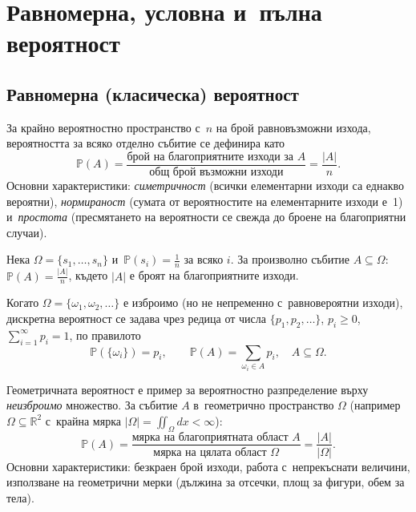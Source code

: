 \chapter{Равномерна, условна и~пълна вероятност}

\section{Равномерна (класическа) вероятност}

\begin{defbox}
За крайно вероятностно пространство с~$n$ на брой равновъзможни
изхода, вероятността за всяко отделно събитие се дефинира като
\[
  \mathbb{P}(A) = \frac{\text{брой на благоприятните изходи за } A}{\text{общ брой възможни изходи}} = \frac{|A|}{n}.
\]
Основни характеристики: \emph{симетричност} (всички елементарни
изходи са еднакво вероятни), \emph{нормираност} (сумата от
вероятностите на елементарните изходи е~1) и~\emph{простота}
(пресмятането на вероятности се свежда до броене на благоприятни
случаи).
\end{defbox}

\begin{rembox}
Нека $\Omega=\{s_1,\dots,s_n\}$ и~$\mathbb{P}(s_i)=\tfrac1n$ за всяко
$i$. За произволно събитие $A\subseteq\Omega$: $\mathbb{P}(A)=
\tfrac{|A|}{n}$, където $|A|$ е броят на благоприятните изходи.
\end{rembox}

\begin{defbox}
Когато $\Omega=\{\omega_1,\omega_2,\dots\}$ е изброимо (но не
непременно с~равновероятни изходи), дискретна вероятност се задава
чрез редица от числа $\{p_1,p_2,\dots\}$, $p_i\geq 0$,
$\sum_{i=1}^{\infty}p_i=1$, по правилото
\[
  \mathbb{P}(\{\omega_i\})=p_i,\qquad \mathbb{P}(A)=\sum_{\omega_i\in A}p_i,\quad A\subseteq\Omega.
\]
\end{defbox}

\begin{defbox}
Геометричната вероятност е пример за вероятностно разпределение
върху \emph{неизброимо} множество. За събитие $A$ в~геометрично
пространство $\Omega$ (например $\Omega\subseteq\mathbb{R}^2$ с~крайна
мярка $|\Omega|=\iint_\Omega dx<\infty$):
\[
  \mathbb{P}(A) = \frac{\text{мярка на благоприятната област } A}{\text{мярка на цялата област } \Omega} = \frac{|A|}{|\Omega|}.
\]
Основни характеристики: безкраен брой изходи, работа с~непрекъснати
величини, използване на геометрични мерки (дължина за отсечки, площ
за фигури, обем за тела).
\end{defbox}

